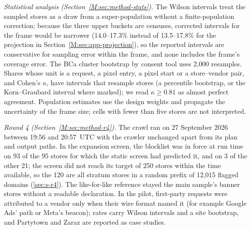 \documentclass[preprint,11pt,authoryear,a4paper]{elsarticle}
\begin{document}
\emph{Statistical analysis (Section~\ref*{M:sec:method-stats}).} The Wilson intervals treat the sampled stores as a draw from a super-population without a finite-population correction; because the three upper buckets are censuses, corrected intervals for the frame would be narrower (14.0--17.3\% instead of 13.5--17.8\% for the projection in Section~\ref*{M:sec:app-projection}), so the reported intervals are conservative for sampling error within the frame, and none includes the frame's coverage error. The BCa cluster bootstrap by consent tool uses 2,000 resamples. Shares whose unit is a request, a pixel entry, a pixel start or a store--vendor pair, and Cohen's $\kappa$, have intervals that resample stores (a percentile bootstrap, or the Korn--Graubard interval where marked); we read $\kappa \ge 0.81$ as almost perfect agreement. Population estimates use the design weights and propagate the uncertainty of the frame size; cells with fewer than five stores are not interpreted.

\emph{Round 4 (Section~\ref*{M:sec:method-r4}).} The crawl ran on 27 September 2026 between 19:56 and 20:57~UTC with the crawler unchanged apart from its plan and output paths. In the expansion screen, the blocklist was in force at run time on 93 of the 95 stores for which the static screen had predicted it, and on 3 of the other 21; the screen did not reach its target of 250 stores within the time available, so the 120 are all stratum stores in a random prefix of 12,015 flagged domains (\ref{sec:s-r4}). The like-for-like reference stayed the main sample's banner stores without a readable declaration. In the pilot, first-party requests were attributed to a vendor only when their wire format named it (for example Google Ads'  path or Meta's  beacon); rates carry Wilson intervals and a site bootstrap, and Partytown and Zaraz are reported as case studies.
\end{document}
